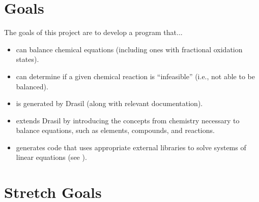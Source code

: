 \documentclass{article}
\begin{document}
\section{Goals}

The goals of this project are to develop a program that...

\begin{itemize}
    \item can balance chemical equations (including ones with fractional
    oxidation states).
    \item can determine if a given chemical reaction is ``infeasible'' (i.e.,
    not able to be balanced).
    \item is generated by Drasil (along with relevant documentation).
    \item extends Drasil by introducing the concepts from chemistry necessary
    to balance equations, such as elements, compounds, and reactions.
    \item generates code that uses appropriate external libraries to solve
    systems of linear equations (see \cite[Ch. 4]{chen_solving_2022}).
\end{itemize}

\section{Stretch Goals}



\end{document}
